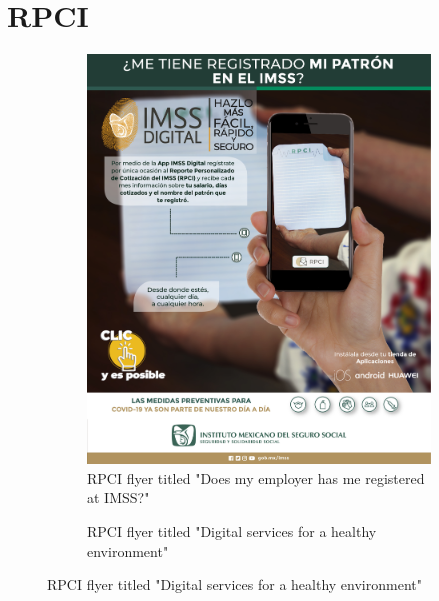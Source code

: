 \clearpage

\section{ RPCI}
\vspace{.2in}

\begin{figure}[H]
    \caption{RPCI flyers}
    \label{rpci_flyers}
    \begin{center}
    
    \begin{subfigure}{0.49\textwidth}
    \caption{RPCI flyer titled "Does my employer has me registered at IMSS?"}
    \includegraphics[width=\textwidth]{04_Figures/rpci_app/rpci_flyer_3.jpeg}
    \end{subfigure}
    \begin{subfigure}{0.49\textwidth}
    \caption{RPCI flyer titled "Digital services for a healthy environment"}

\end{subfigure}
\end{center}
\end{figure}
